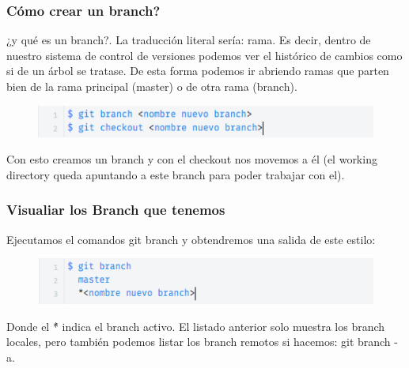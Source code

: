 \begin{frame}[fragile]
    \frametitle{C\'omo crear un branch?}
    ¿y qu\'e es un branch?. La traducci\'on literal ser\'ia: rama.
    Es decir, dentro de nuestro sistema de control de versiones podemos ver
    el hist\'orico de cambios como si de un \'arbol se tratase. 
    De esta forma podemos ir abriendo ramas que parten bien de la rama 
    principal (master) o de otra rama (branch).
    \begin{figure}
        \includegraphics[width=1\textwidth]{Images/13.png}
    \end{figure}
    Con esto creamos un branch y con el checkout nos movemos a \'el 
    (el working directory queda apuntando a este branch para poder trabajar 
     con el).
\end{frame}

\begin{frame}[fragile]
    \frametitle{Visualiar los Branch que tenemos}
    Ejecutamos el comandos \alert{git branch} y obtendremos una salida de 
    este estilo:
    \begin{figure}
        \includegraphics[width=1\textwidth]{Images/14.png}
    \end{figure}
    Donde el \'* indica el branch activo. El listado anterior solo muestra 
    los branch locales, pero tambi\'en podemos listar los branch remotos si 
    hacemos: \alert{git branch -a}.
\end{frame}

